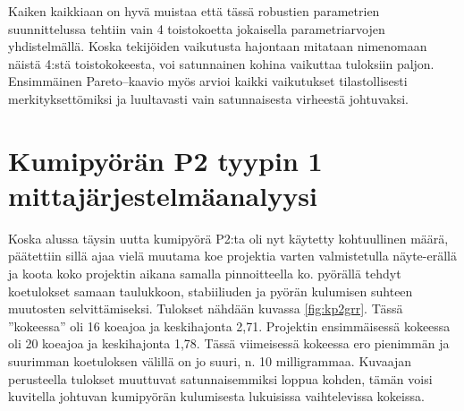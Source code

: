 \documentclass[12pt,a4paper,finnish]{tutthesis}
\begin{document}
Kaiken kaikkiaan on hyvä muistaa että tässä robustien parametrien suunnittelussa tehtiin vain 4 toistokoetta jokaisella parametriarvojen yhdistelmällä.
Koska tekijöiden vaikutusta hajontaan mitataan nimenomaan näistä 4:stä toistokokeesta,
voi satunnainen kohina vaikuttaa tuloksiin paljon.
Ensimmäinen Pareto–kaavio myös arvioi kaikki vaikutukset tilastollisesti merkityksettömiksi
ja luultavasti vain satunnaisesta virheestä johtuvaksi.

\section{Kumipyörän P2 tyypin 1 mittajärjestelmäanalyysi}

Koska alussa täysin uutta kumipyörä P2:ta oli nyt käytetty kohtuullinen määrä, päätettiin sillä ajaa vielä muutama koe projektia varten valmistetulla näyte-erällä ja koota koko projektin aikana samalla pinnoitteella ko. pyörällä tehdyt koetulokset samaan taulukkoon, stabiiliuden ja pyörän kulumisen suhteen muutosten selvittämiseksi. Tulokset nähdään kuvassa \ref{fig:kp2grr}.
Tässä ”kokeessa” oli 16 koeajoa ja keskihajonta 2,71. Projektin ensimmäisessä kokeessa oli 20 koeajoa ja keskihajonta 1,78. Tässä viimeisessä kokeessa ero pienimmän ja suurimman koetuloksen välillä on jo suuri, n. 10 milligrammaa. Kuvaajan perusteella tulokset
muuttuvat
satunnaisemmiksi loppua kohden, tämän voisi kuvitella johtuvan kumipyörän kulumisesta lukuisissa vaihtelevissa kokeissa.
\end{document}
